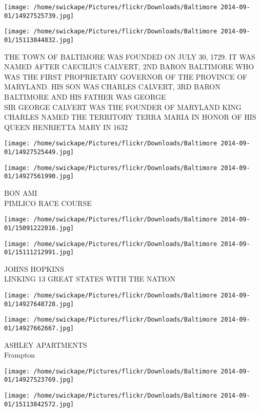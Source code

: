 \documentclass[10pt,letterpaper]{article}
\begin{document}
\texttt{[image: /home/swickape/Pictures/flickr/Downloads/Baltimore 2014-09-01/14927525739.jpg]}

\vspace{0.25in}
\texttt{[image: /home/swickape/Pictures/flickr/Downloads/Baltimore 2014-09-01/15113844832.jpg]}

THE TOWN OF BALTIMORE WAS FOUNDED ON JULY 30, 1729.  IT WAS NAMED AFTER CAECILIUS CALVERT, 2ND BARON BALTIMORE WHO WAS THE FIRST PROPRIETARY GOVERNOR OF THE PROVINCE OF MARYLAND.  HIS SON WAS CHARLES CALVERT, 3RD BARON BALTIMORE AND HIS FATHER WAS GEORGE\\
SIR GEORGE CALVERT WAS THE FOUNDER OF MARYLAND KING CHARLES NAMED THE TERRITORY TERRA MARIA IN HONOR OF HIS QUEEN HENRIETTA MARY IN 1632
\pagebreak

\texttt{[image: /home/swickape/Pictures/flickr/Downloads/Baltimore 2014-09-01/14927525449.jpg]}

\vspace{0.25in}
\texttt{[image: /home/swickape/Pictures/flickr/Downloads/Baltimore 2014-09-01/14927561990.jpg]}

BON AMI\\
PIMLICO RACE COURSE
\pagebreak

\texttt{[image: /home/swickape/Pictures/flickr/Downloads/Baltimore 2014-09-01/15091222016.jpg]}

\vspace{0.25in}
\texttt{[image: /home/swickape/Pictures/flickr/Downloads/Baltimore 2014-09-01/15111212991.jpg]}

JOHNS HOPKINS\\
LINKING 13 GREAT STATES WITH THE NATION
\pagebreak

\texttt{[image: /home/swickape/Pictures/flickr/Downloads/Baltimore 2014-09-01/14927648728.jpg]}

\vspace{0.25in}
\texttt{[image: /home/swickape/Pictures/flickr/Downloads/Baltimore 2014-09-01/14927662667.jpg]}

ASHLEY APARTMENTS\\
Frampton
\pagebreak

\texttt{[image: /home/swickape/Pictures/flickr/Downloads/Baltimore 2014-09-01/14927523769.jpg]}

\vspace{0.25in}
\texttt{[image: /home/swickape/Pictures/flickr/Downloads/Baltimore 2014-09-01/15113842572.jpg]}
\end{document}
